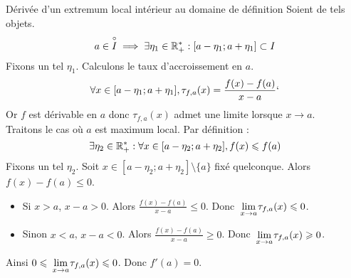 \documentclass{article}
\renewenvironment{question_kholle}[2][ ]
{
	\subsection{\texorpdfstring{#2}{}}
	\notblank{#1}
	{
		\noindent #1
		\bigbreak
	}
	{}
	\begin{proof}
}
{
	\end{proof}
}
\begin{document}
\begin{question_kholle}
	[Soit $f : I \rightarrow \R$. Si $f$ admet un extremum local en $a \in \overset{\circ}{I}$ et si $f$ est dérivable en $a$, alors $f'(a) = 0$.
			{\begin{figure}[!h]
					\centering
					\tikzmath{ real \m; real \fm; \m = 5/3; \fm = 23/27; }
					\begin{tikzpicture}[scale=2]
						\draw[-stealth] (0,0) -- (3,0) node[anchor=west] {$x$};
						\draw[-stealth] (0,0) -- (0,2) node[anchor=south] {$y$};

						\draw[purple, thick, smooth, samples=200, domain=0.3:2.4]
						plot(\x, {1 + pow((\x-1),3) - pow((\x-1),2)});
						\draw[teal, dashed] (\m,\fm) -- (\m,0) node[anchor=north] {$m$};

						\draw[stealth-stealth, teal] (\m-0.8,\fm) -- (\m+0.8,\fm);
						\draw (\m,\fm) node[above=1em,teal] {$f'(m)=0$};
					\end{tikzpicture}
				\end{figure}}]
	{Dérivée d'un extremum local intérieur au domaine de définition}
	Soient de tels objets. \\
	$$a \in \overset{\circ}{I} \implies \exists \eta_1 \in \mathbb R_+^* : [a-\eta_1;a+\eta_1] \subset I$$
	Fixons un tel $\eta_1$.
	Calculons le taux d'accroissement en $a$.
	\begin{equation*}
		\forall x \in [a-\eta_1;a+\eta_1], \tau_{f,a}(x) = \frac{f(x) - f(a)}{x - a}`
	\end{equation*}
	Or $f$ est dérivable en $a$ donc $\tau_{f,a}(x)$ admet une limite lorsque $x \rightarrow a$.\\
	Traitons le cas où $a$ est maximum local. Par définition :
	\begin{equation*}
		\exists \eta_2 \in \mathbb R_+^* : \forall x \in [a-\eta_2;a+\eta_2], f(x) \leqslant f(a)
	\end{equation*}
	Fixons un tel $\eta_2$. Soit $x \in [a-\eta_2;a+\eta_2] \setminus \{a\}$ fixé quelconque.
	Alors $f(x) - f(a) \leqslant 0$. \\
	\begin{itemize}[label=$\bullet$]
		\item	Si $x > a$, $x - a > 0$. Alors $\frac{f(x) - f(a)}{x - a} \leqslant 0$. Donc $\lim\limits_{\;x \to a\;}\!\! \tau_{f,a}(x) \leqslant 0$. \\
		\item Sinon $x < a$, $x - a < 0$. Alors $\frac{f(x) - f(a)}{x - a} \geqslant 0$. Donc $\lim\limits_{\;x \to a\;}\!\! \tau_{f,a}(x) \geqslant 0$. \\
	\end{itemize}
	Ainsi $0 \leqslant \lim\limits_{\;x \to a\;}\!\! \tau_{f,a}(x) \leqslant 0$. Donc $f'(a) = 0$.
\end{question_kholle}
\end{document}
